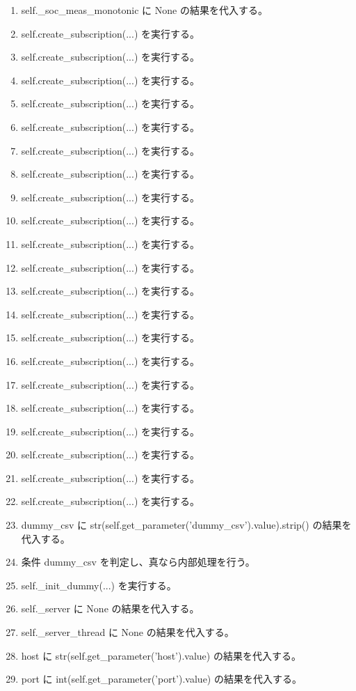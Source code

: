 \documentclass[a4paper,11pt]{article}
\begin{document}
\begin{enumerate}[leftmargin=1.8em]
\item self.\_soc\_meas\_monotonic に None の結果を代入する。
\item self.create\_subscription(...) を実行する。
\item self.create\_subscription(...) を実行する。
\item self.create\_subscription(...) を実行する。
\item self.create\_subscription(...) を実行する。
\item self.create\_subscription(...) を実行する。
\item self.create\_subscription(...) を実行する。
\item self.create\_subscription(...) を実行する。
\item self.create\_subscription(...) を実行する。
\item self.create\_subscription(...) を実行する。
\item self.create\_subscription(...) を実行する。
\item self.create\_subscription(...) を実行する。
\item self.create\_subscription(...) を実行する。
\item self.create\_subscription(...) を実行する。
\item self.create\_subscription(...) を実行する。
\item self.create\_subscription(...) を実行する。
\item self.create\_subscription(...) を実行する。
\item self.create\_subscription(...) を実行する。
\item self.create\_subscription(...) を実行する。
\item self.create\_subscription(...) を実行する。
\item self.create\_subscription(...) を実行する。
\item self.create\_subscription(...) を実行する。
\item dummy\_csv に str(self.get\_parameter('dummy\_csv').value).strip() の結果を代入する。
\item 条件 dummy\_csv を判定し、真なら内部処理を行う。
\item   self.\_init\_dummy(...) を実行する。
\item self.\_server に None の結果を代入する。
\item self.\_server\_thread に None の結果を代入する。
\item host に str(self.get\_parameter('host').value) の結果を代入する。
\item port に int(self.get\_parameter('port').value) の結果を代入する。

\end{enumerate}
\end{document}
